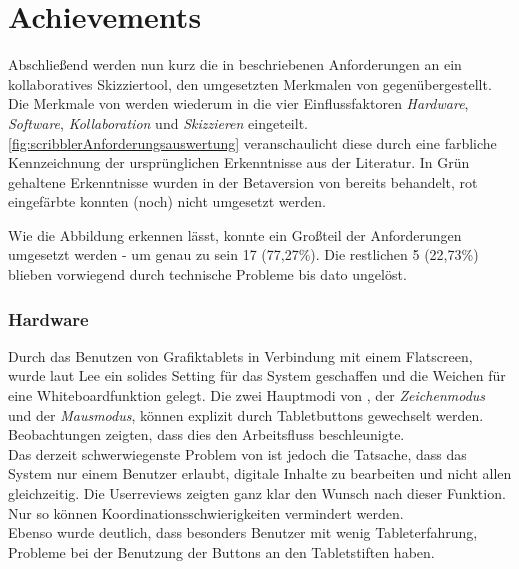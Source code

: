 \section{Achievements}
Abschließend werden nun kurz die in  beschriebenen Anforderungen an ein kollaboratives Skizziertool, den umgesetzten Merkmalen von \scribbler gegenübergestellt. Die Merkmale von \scribbler werden wiederum in die vier Einflussfaktoren \emph{Hardware}, \emph{Software}, \emph{Kollaboration} und \emph{Skizzieren} eingeteilt.  \autoref{fig:scribblerAnforderungsauswertung} veranschaulicht diese durch eine farbliche Kennzeichnung der ursprünglichen Erkenntnisse aus der Literatur. In Grün gehaltene Erkenntnisse wurden in der Betaversion von \scribbler bereits behandelt, rot eingefärbte konnten (noch) nicht umgesetzt werden.

\medskip Wie die Abbildung erkennen lässt, konnte ein Großteil der Anforderungen umgesetzt werden - um genau zu sein 17 (77,27\%). Die restlichen 5 (22,73\%) blieben vorwiegend durch technische Probleme bis dato ungelöst.

\subsubsection*{Hardware} 
Durch das Benutzen von Grafiktablets in Verbindung mit einem Flatscreen, wurde laut Lee ein solides Setting für das System geschaffen und die Weichen für eine Whiteboardfunktion gelegt. Die zwei Hauptmodi von \scribbler, der \emph{Zeichenmodus} und der \emph{Mausmodus}, können explizit durch Tabletbuttons gewechselt werden. Beobachtungen zeigten, dass dies den Arbeitsfluss beschleunigte.\\
Das derzeit schwerwiegenste Problem von \scribbler ist jedoch die Tatsache, dass das System nur einem Benutzer erlaubt, digitale Inhalte zu bearbeiten und nicht allen gleichzeitig. Die Userreviews zeigten ganz klar den Wunsch nach dieser Funktion. Nur so können Koordinationsschwierigkeiten vermindert werden. \\
Ebenso wurde deutlich, dass besonders Benutzer mit wenig Tableterfahrung, Probleme bei der Benutzung der Buttons an den Tabletstiften haben.

